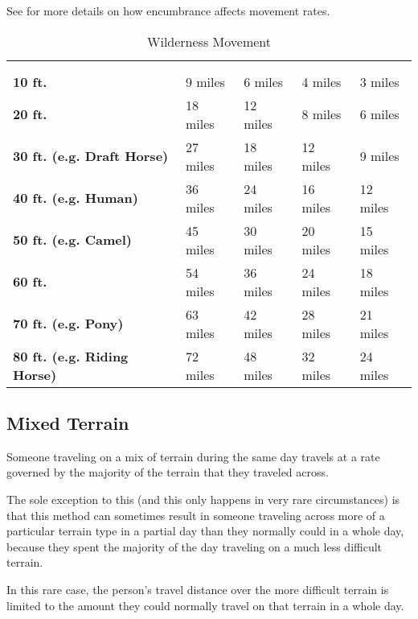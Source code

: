 \begin{multicols*}{2}
See  for more details on how encumbrance affects movement rates.

\begin {table}[H]
  \caption{Wilderness Movement}\label{tab:Wilderness Movement}
	\begin{tabularx}{\columnwidth}{>{\bfseries}YYYYY}
	\thead{} & \\
	 &  &  &  & \\
	10 ft. & 9 miles & 6 miles & 4 miles & 3 miles\\
	20 ft. & 18 miles & 12 miles & 8 miles & 6 miles\\
	30 ft. (e.g. Draft Horse) & 27 miles & 18 miles & 12 miles & 9 miles\\
	40 ft. (e.g. Human) & 36 miles & 24 miles & 16 miles & 12 miles\\
	50 ft. (e.g. Camel) & 45 miles & 30 miles & 20 miles & 15 miles\\
	60 ft. & 54 miles & 36 miles & 24 miles & 18 miles\\
	70 ft. (e.g. Pony) & 63 miles & 42 miles & 28 miles & 21 miles\\
	80 ft. (e.g. Riding Horse) & 72 miles & 48 miles & 32 miles & 24 miles
  \end {tabularx}
\end {table}

\subsection{Mixed Terrain}
Someone traveling on a mix of terrain during the same day travels at a rate governed by the majority of the terrain that they traveled across.

The sole exception to this (and this only happens in very rare circumstances) is that this method can sometimes result in someone traveling across more of a particular terrain type in a partial day than they normally could in a whole day, because they spent the majority of the day traveling on a much less difficult terrain.

In this rare case, the person’s travel distance over the more difficult terrain is limited to the amount they could normally travel on that terrain in a whole day.

\end{multicols*}
